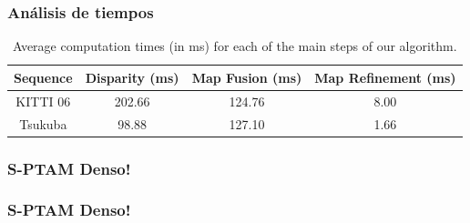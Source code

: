 \documentclass[compress]{beamer}
\begin{document}
%

\begin{frame}
	\frametitle{Análisis de tiempos}
	\begin{table}[!htb]
		\centering
		\small
		\begin{tabular}{cccc}
			\toprule
			Sequence & Disparity (ms) & Map Fusion (ms) & Map Refinement (ms) \\
			\midrule
			KITTI 06 & 202.66 & 124.76 & 8.00 \\
			Tsukuba & 98.88 & 127.10 & 1.66 \\
			\bottomrule
		\end{tabular}
		\caption{Average computation times (in ms) for each of the main steps of our algorithm.} \label{table:table_times}
	\end{table}
\end{frame}

\begin{frame}
	\frametitle{S-PTAM Denso!}
	\centering
	
\end{frame}

\begin{frame}
	\frametitle{S-PTAM Denso!}
	\centering
	
\end{frame}
\end{document}
